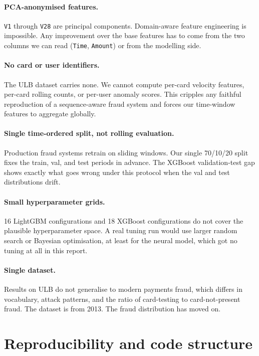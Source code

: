 \documentclass{article}
\begin{document}
\paragraph{PCA-anonymised features.} \texttt{V1} through \texttt{V28} are principal components. Domain-aware feature engineering is impossible. Any improvement over the base features has to come from the two columns we can read (\texttt{Time}, \texttt{Amount}) or from the modelling side.

\paragraph{No card or user identifiers.} The ULB dataset carries none. We cannot compute per-card velocity features, per-card rolling counts, or per-user anomaly scores. This cripples any faithful reproduction of a sequence-aware fraud system and forces our time-window features to aggregate globally.

\paragraph{Single time-ordered split, not rolling evaluation.} Production fraud systems retrain on sliding windows. Our single 70/10/20 split fixes the train, val, and test periods in advance. The XGBoost validation-test gap shows exactly what goes wrong under this protocol when the val and test distributions drift.

\paragraph{Small hyperparameter grids.} 16 LightGBM configurations and 18 XGBoost configurations do not cover the plausible hyperparameter space. A real tuning run would use larger random search or Bayesian optimisation, at least for the neural model, which got no tuning at all in this report.

\paragraph{Single dataset.} Results on ULB do not generalise to modern payments fraud, which differs in vocabulary, attack patterns, and the ratio of card-testing to card-not-present fraud. The dataset is from 2013. The fraud distribution has moved on.

\section{Reproducibility and code structure}
\end{document}
